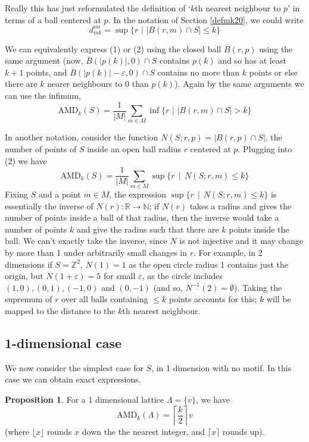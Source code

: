 \documentclass[11pt]{article}
\theoremstyle{definition}
\newtheorem{prop}{Proposition}
\begin{document}
Really this has just reformulated the definition of `$k$th nearest neighbour to $p$' in terms of a ball centered at $p$. In the notation of Section \ref{defmk20}, we could write
\[
d^{nn}_{mk} = \sup \{r \,\,|\,\, |B(r,m) \cap S| \leq k\}
\]

We can equivalently express (1) or (2) using the closed ball $\overline{B}(r,p)$ using the same argument (now, $\overline{B}(|p(k)|,0)\cap S$ contains $p(k)$ and so has at least $k+1$ points, and $\overline{B}(|p(k)|-\varepsilon,0)\cap S$ contains no more than $k$ points or else there are $k$ nearer neighbours to $0$ than $p(k)$). Again by the same arguments we can use the infimum,
\[
\text{AMD}_k(S) = \frac{1}{|M|}\sum_{m\in M}\inf \{r \,\,|\,\, |B(r,m) \cap S| > k\}
\]

In another notation, consider the function $N(S;r,p) = |B(r,p)\cap S|$, the number of points of $S$ inside an open ball radius $r$ centered at $p$. Plugging into (2) we have
\[
\text{AMD}_k(S) = \frac{1}{|M|}\sum_{m\in M}\sup \{r \, \mid \,N(S;r,m) \leq k\}
\]
Fixing $S$ and a point $m\in M$, the expression $\sup \{r \, \mid \,N(S;r,m) \leq k\}$ is essentially the inverse of $N(r):\mathbb{R}\rightarrow \mathbb{N}$; if $N(r)$ takes a radius and gives the number of points inside a ball of that radius, then the inverse would take a number of points $k$ and give the radius such that there are $k$ points inside the ball. We can't exactly take the inverse, since $N$ is not injective and it may change by more than 1 under arbitrarily small changes in $r$. For example, in 2 dimensions if $S = \mathbb{Z}^2$, $N(1) = 1$ as the open circle radius 1 contains just the origin, but $N(1+\varepsilon) = 5$ for small $\varepsilon$, as the circle includes $(1,0), (0,1), (-1,0)$ and $(0,-1)$ (and so, $N^{-1}(2)=\emptyset$). Taking the supremum of $r$ over all balls containing $\leq k$ points accounts for this; $k$ will be mapped to the distance to the $k$th nearest neighbour. 

\subsection{1-dimensional case}

We now consider the simplest case for $S$, in 1 dimension with no motif. In this case we can obtain exact expressions.

\begin{prop} For a 1 dimensional lattice $\Lambda = \{v\}$, we have
\[
\text{AMD}_k(\Lambda) = \left\lceil \frac{k}{2} \right\rceil v
\]
(where $\lfloor x \rfloor$ rounds $x$ down the the nearest integer, and $\lceil x \rceil$ rounds up).
\end{prop}
\end{document}
